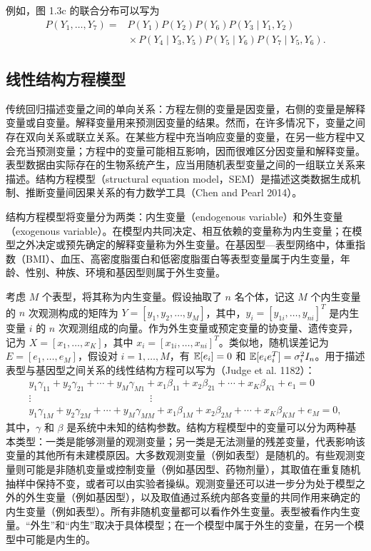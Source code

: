 例如，图 1.3c 的联合分布可以写为
\[
 \begin{aligned}
 P(Y_1,\ldots,Y_7)
  ={}&P(Y_1)P(Y_2)P(Y_6)P(Y_3\mid Y_1,Y_2)\\
    &{}\times P(Y_4\mid Y_3,Y_5)P(Y_5\mid Y_6)P(Y_7\mid Y_5,Y_6).
 \end{aligned}
\]

\subsection{线性结构方程模型}
\label{sec:ch01b-linear-sem}

传统回归描述变量之间的单向关系：方程左侧的变量是因变量，右侧的变量是解释变量或自变量。解释变量用来预测因变量的结果。然而，在许多情况下，变量之间存在双向关系或联立关系。在某些方程中充当响应变量的变量，在另一些方程中又会充当预测变量；方程中的变量可能相互影响，因而很难区分因变量和解释变量。表型数据由实际存在的生物系统产生，应当用随机表型变量之间的一组联立关系来描述。结构方程模型（structural equation model，SEM）是描述这类数据生成机制、推断变量间因果关系的有力数学工具（Chen and Pearl 2014）。

结构方程模型将变量分为两类：内生变量（endogenous variable）和外生变量（exogenous variable）。在模型内共同决定、相互依赖的变量称为内生变量；在模型之外决定或预先确定的解释变量称为外生变量。在基因型—表型网络中，体重指数（BMI）、血压、高密度脂蛋白和低密度脂蛋白等表型变量属于内生变量，年龄、性别、种族、环境和基因型则属于外生变量。

考虑 $M$ 个表型，将其称为内生变量。假设抽取了 $n$ 名个体，记这 $M$ 个内生变量的 $n$ 次观测构成的矩阵为 $Y=[y_1,y_2,\ldots,y_M]$，其中，$y_i=[y_{1i},\ldots,y_{ni}]^{T}$ 是内生变量 $i$ 的 $n$ 次观测组成的向量。作为外生变量或预定变量的协变量、遗传变异，记为 $X=[x_1,\ldots,x_K]$，其中 $x_i=[x_{1i},\ldots,x_{ni}]^{T}$。类似地，随机误差记为 $E=[e_1,\ldots,e_M]$，假设对 $i=1,\ldots,M$，有 $\mathbb{E}[e_i]=0$ 和 $\mathbb{E}[e_i e_i^{T}]=\sigma_i^2 I_n$。用于描述表型与基因型之间关系的线性结构方程可以写为（Judge et al. 1182）：
\begin{equation}
 \begin{gathered}
 y_1\gamma_{11}+y_2\gamma_{21}+\cdots+y_M\gamma_{M1}
   +x_1\beta_{11}+x_2\beta_{21}+\cdots+x_K\beta_{K1}+e_1=0\\
 \vdots\hspace{5cm}\vdots\\
 y_1\gamma_{1M}+y_2\gamma_{2M}+\cdots+y_M\gamma_{MM}
   +x_1\beta_{1M}+x_2\beta_{2M}+\cdots+x_K\beta_{KM}+e_M=0,
 \end{gathered}
 \tag{1.49}
\end{equation}
其中，$\gamma$ 和 $\beta$ 是系统中未知的结构参数。结构方程模型中的变量可以分为两种基本类型：一类是能够测量的观测变量；另一类是无法测量的残差变量，代表影响该变量的其他所有未建模原因。大多数观测变量（例如表型）是随机的。有些观测变量则可能是非随机变量或控制变量（例如基因型、药物剂量），其取值在重复随机抽样中保持不变，或者可以由实验者操纵。观测变量还可以进一步分为处于模型之外的外生变量（例如基因型），以及取值通过系统内部各变量的共同作用来确定的内生变量（例如表型）。所有非随机变量都可以看作外生变量。表型被看作内生变量。“外生”和“内生”取决于具体模型；在一个模型中属于外生的变量，在另一个模型中可能是内生的。

